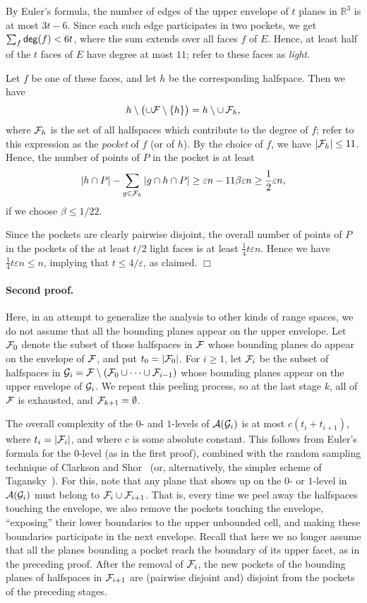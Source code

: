 \documentclass[12pt]{article}
\newcommand{\eps}{{\varepsilon}}
\newcommand{\reals}{{\mathbb R}}
\def\A{{\cal A}}
\def\F{{\cal F}}
\def\G{{\cal G}}
\def\dg{{\sf deg}}
\newcommand{\cardin}[1]{\left|#1\right|}
\begin{document}
By Euler's formula, the number of edges of the upper envelope
of $t$ planes in $\reals^3$ is at most $3t-6$.
Since each such edge participates in two pockets, we get
$\sum_f \dg(f) < 6t$, where the sum extends over all faces $f$ of $E$.
Hence, at least half of the $t$ faces of $E$ have degree at most $11$;
refer to these faces as \emph{light}.

Let $f$ be one of these faces, and let $h$ be the corresponding
halfspace. Then we have
\begin{align*}
    h\setminus \left ( \cup\F\setminus\{h\} \bigl. \right)=h \setminus \cup \, \F_h ,
\end{align*}
where $\F_h$ is the set of all halfspaces which contribute to the
degree of $f$; refer to this expression as the {\em pocket} of $f$ (or
of $h$). By the choice of $f$, we have $|\F_h|\le 11$.
Hence, the number of points of $P$ in the pocket is at least
$$
|h\cap P| - \sum_{g\in\F_h} |g\cap h\cap P| \ge
\eps n - 11\beta\eps n \ge \frac12\eps n ,
$$
if we choose $\beta\le 1/22$.

Since the pockets are clearly pairwise disjoint, the overall number of
points of $P$ in the pockets of the at least $t/2$ light faces
is at least $\frac14t\eps n$. Hence we have $\frac14t\eps n \le n$,
implying that $t\le 4/\eps$, as claimed.  $\Box$

\paragraph{Second proof.}
Here, in an attempt to generalize the analysis to other kinds of range
spaces, we do not assume that all the bounding planes appear on the
upper envelope. Let $\F_0$ denote the subset of those halfspaces in
$\F$ whose bounding planes do appear on the envelope of $\F$, and put
$t_0=|\F_0|$. For $i \geq 1$, let $\F_i$ be the subset of halfspaces
in $\G_i =\F \setminus (\F_0 \cup \cdots \cup \F_{i-1})$ whose bounding
planes appear on the upper envelope of $\G_i$. We repeat this peeling
process, so at the last stage $k$, all of $\F$ is exhausted, and
$\F_{k+1}=\emptyset$.

The overall complexity of the $0$- and $1$-levels of $\A(\G_i)$ is at
most $c(t_{i}+t_{i+1})$, where $t_i = \cardin{\F_i}$, and where $c$ is
some absolute constant. This follows from Euler's formula for the
$0$-level (as in the first proof), combined with the random sampling
technique of Clarkson and Shor~\cite{cs-arscg-89} (or, alternatively,
the simpler scheme of Tagansky~\cite{t-ntasa-96}).  For this, note
that any plane that shows up on the $0$- or $1$-level in $\A(\G_i)$
must belong to $\F_i\cup\F_{i+1}$.  That is, every time we peel away
the halfspaces touching the envelope, we also remove the pockets
touching the envelope, ``exposing'' their lower boundaries to the
upper unbounded cell, and making these boundaries participate in the
next envelope.  Recall that here we no longer assume that all the
planes bounding a pocket reach the boundary of its upper facet, as in
the preceding proof.  After the removal of $\F_i$, the new pockets of
the bounding planes of halfspaces in $\F_{i+1}$ are (pairwise disjoint
and) disjoint from the pockets of the preceding stages.
\end{document}
